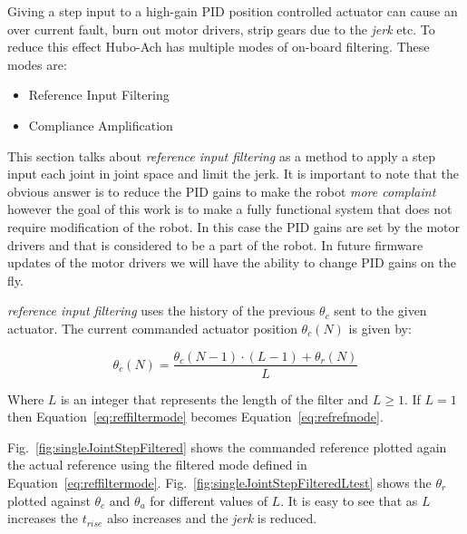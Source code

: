 Giving a step input to a high-gain PID position controlled actuator can cause an over current fault, burn out motor drivers, strip gears due to the \textit{jerk} etc.  
To reduce this effect Hubo-Ach has multiple modes of on-board filtering.
These modes are:
\begin{multicols}{2}
\begin{itemize}
\item Reference Input Filtering
\item Compliance Amplification 
\end{itemize}
\end{multicols}

This section talks about \textit{reference input filtering} as a method to apply a step input each joint in joint space and limit the jerk.
It is important to note that the obvious answer is to reduce the PID gains to make the robot \textit{more complaint} however the goal of this work is to make a fully functional system that does not require modification of the robot.
In this case the PID gains are set by the motor drivers and that is considered to be a part of the robot.
In future firmware updates of the motor drivers we will have the ability to change PID gains on the fly.

\textit{reference input filtering} uses the history of the previous $\theta_c$ sent to the given actuator.  The current commanded actuator position $\theta_c(N)$ is given by:

\begin{equation}\label{eq:reffiltermode}
\theta_c(N) = \frac{\theta_c(N-1)\cdot\left(L-1\right) + \theta_r(N)}{L}
\end{equation}

Where $L$ is an integer that represents the length of the filter and $L\geq1$.  
If $L=1$ then Equation~\ref{eq:reffiltermode} becomes Equation~\ref{eq:refrefmode}.





Fig.~\ref{fig:singleJointStepFiltered} shows the commanded reference plotted again the actual reference using the filtered mode defined in Equation~\ref{eq:reffiltermode}.
Fig.~\ref{fig:singleJointStepFilteredLtest} shows the $\theta_r$ plotted against $\theta_c$ and $\theta_a$ for different values of $L$.
It is easy to see that as $L$ increases the $t_{rise}$ also increases and the \textit{jerk} is reduced.


